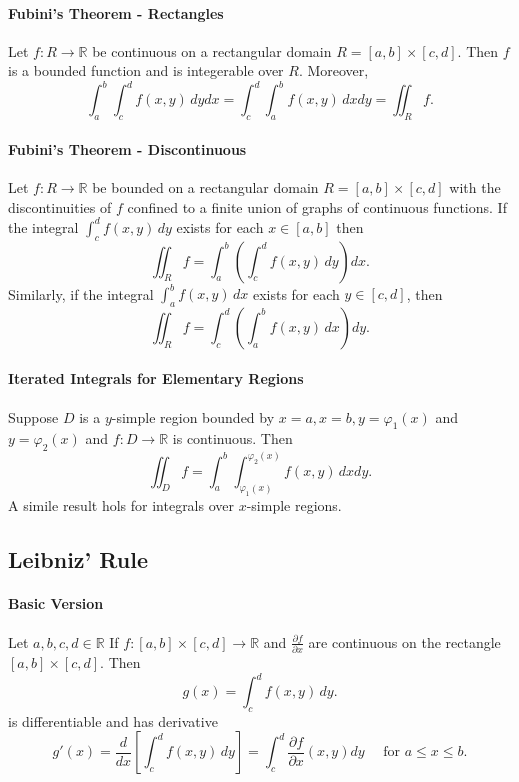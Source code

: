 \paragraph{Fubini's Theorem - Rectangles}
Let \(f: R \to \mathbb R\) be continuous on a rectangular domain \(R = [a, b] \times [c,d].\) Then \(f\) is a bounded function and is integerable over \(R\). Moreover,
\[\int_a^b\int_c^d f(x,y) \, dydx = \int_c^d\int_a^b f(x,y) \, dxdy = \iint_R f.\]

\paragraph{Fubini's Theorem - Discontinuous}
Let \(f: R \to \mathbb R\) be bounded on a rectangular domain \(R= [a,b] \times [c,d]\) with the discontinuities of \(f\) confined to a finite union of graphs of continuous functions. If the integral \(\int_c^d f(x,y) \, dy\) exists for each \(x\in[a,b]\) then
\[\iint_R f = \int_a^b \left(\int_c^d f(x,y) \, dy\right) dx.\]
Similarly, if the integral \(\int_a^b f(x,y) \, dx\) exists for each \(y\in[c,d]\), then
\[\iint_R f = \int_c^d \left(\int_a^b f(x,y) \, dx\right) dy.\]

\paragraph{Iterated Integrals for Elementary Regions}
Suppose \(D\) is a \(y\)-simple region bounded by \(x=a, x=b, y= \varphi_1(x)\) and \(y=\varphi_2(x)\) and \(f:D\to \mathbb R\) is continuous. Then
\[\iint_D f = \int_a^b \int_{\varphi_1(x)}^{\varphi_2(x)} f(x,y) \, dx dy.\]
A simile result hols for integrals over \(x\)-simple regions.

\subsection{Leibniz' Rule}
\paragraph{Basic Version}
Let \(a,b,c,d \in \mathbb R\) If \(f: [a,b] \times [c,d] \to \mathbb R\) and \(\frac{\partial f}{\partial x}\) are continuous on the rectangle \([a,b] \times [c,d]\). Then
\[g(x) = \int_c^d f(x,y) \, dy.\]
is differentiable and has derivative 
\[g'(x) = \frac{d}{dx}\left[\int_c^d f(x,y) \, dy\right] = \int_c^d \frac{\partial f}{\partial x}(x,y) dy \quad \text{ for } a\leq x\leq b.\]

